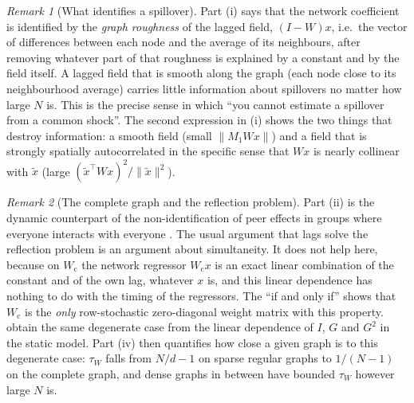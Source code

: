 \documentclass[12pt]{article}
\theoremstyle{plain}
\theoremstyle{definition}
\theoremstyle{remark}
\newtheorem{remark}{Remark}
\newcommand{\Wc}{W_{\mathrm{c}}}
\newcommand{\tauW}{\tau_W}
\newcommand{\T}{^{\top}}
\begin{document}
\begin{remark}[What identifies a spillover]
Part (i) says that the network coefficient is identified by the \emph{graph roughness} of the lagged field, $(I-W)x$, i.e.\ the vector of differences between each node and the average of its neighbours, after removing whatever part of that roughness is explained by a constant and by the field itself. A lagged field that is smooth along the graph (each node close to its neighbourhood average) carries little information about spillovers no matter how large $N$ is. This is the precise sense in which ``you cannot estimate a spillover from a common shock''. The second expression in (i) shows the two things that destroy information: a smooth field (small $\|M_1Wx\|$) and a field that is strongly spatially autocorrelated in the specific sense that $Wx$ is nearly collinear with $\tilde x$ (large $(\tilde x\T Wx)^2/\|\tilde x\|^2$).
\end{remark}

\begin{remark}[The complete graph and the reflection problem]
Part (ii) is the dynamic counterpart of the non-identification of peer effects in groups where everyone interacts with everyone \citep{manski1993identification,lee2007identification}. The usual argument that lags solve the reflection problem is an argument about simultaneity. It does not help here, because on $\Wc$ the network regressor $\Wc x$ is an exact linear combination of the constant and of the own lag, whatever $x$ is, and this linear dependence has nothing to do with the timing of the regressors. The ``if and only if'' shows that $\Wc$ is the \emph{only} row-stochastic zero-diagonal weight matrix with this property. \citet{bramoulle2009identification} obtain the same degenerate case from the linear dependence of $I$, $G$ and $G^2$ in the static model. Part (iv) then quantifies how close a given graph is to this degenerate case: $\tauW$ falls from $N/d-1$ on sparse regular graphs to $1/(N-1)$ on the complete graph, and dense graphs in between have bounded $\tauW$ however large $N$ is.
\end{remark}
\end{document}
